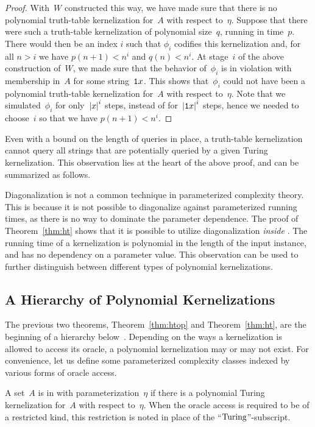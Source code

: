 \begin{proof}
  With~$W$ constructed this way, we have made sure that there is no polynomial truth-table kernelization for~$A$ with respect to~$\eta$.
  Suppose that there were such a truth-table kernelization of polynomial size~$q$, running in time~$p$.
  There would then be an index $i$ such that $\phi_i$ codifies this kernelization and, for all $n > i$ we have $p(n + 1) < n^i$ and $q(n) < n^i$.
  At stage~$i$ of the above construction of~$W$, we made sure that the behavior of~$\phi_i$ is in violation with membership in~$A$ for some string~$\textnormal{\texttt{1}}x$.
  This shows that~$\phi_i$ could not have been a polynomial truth-table kernelization for~$A$ with respect to~$\eta$.
  Note that we simulated~$\phi_i$ for only~${\lvert x\rvert}^i$ steps, instead of for~${\lvert\textnormal{\texttt{1}}x\rvert}^i$ steps, hence we needed to choose~$i$ so that we have $p(n + 1) < n^i$.
\end{proof}

Even with a bound on the length of queries in place, a truth-table kernelization cannot query all strings that are potentially queried by a given Turing kernelization.
This observation lies at the heart of the above proof, and can be summarized as follows.

Diagonalization is not a common technique in parameterized complexity theory.
This is because it is not possible to diagonalize against parameterized running times, as there is no way to dominate the parameter dependence.
The proof of Theorem~\ref{thm:ht} shows that it is possible to utilize diagonalization \emph{inside} .
The running time of a kernelization is polynomial in the length of the input instance, and has no dependency on a parameter value.
This observation can be used to further distinguish between different types of polynomial kernelizations.

\subsection{A Hierarchy of Polynomial Kernelizations}
The previous two theorems, Theorem~\ref{thm:htop} and Theorem~\ref{thm:ht}, are the beginning of a hierarchy below~.
Depending on the ways a kernelization is allowed to access its oracle, a polynomial kernelization may or may not exist.
For convenience, let us define some parameterized complexity classes indexed by various forms of oracle access.
\begin{definition}
  A set~$A$ is in  with parameterization~$\eta$ if there is a polynomial Turing kernelization for~$A$ with respect to~$\eta$.
  When the oracle access is required to be of a restricted kind, this restriction is noted in place of the \enquote{$\textnormal{Turing}$}-subscript.
\end{definition}

